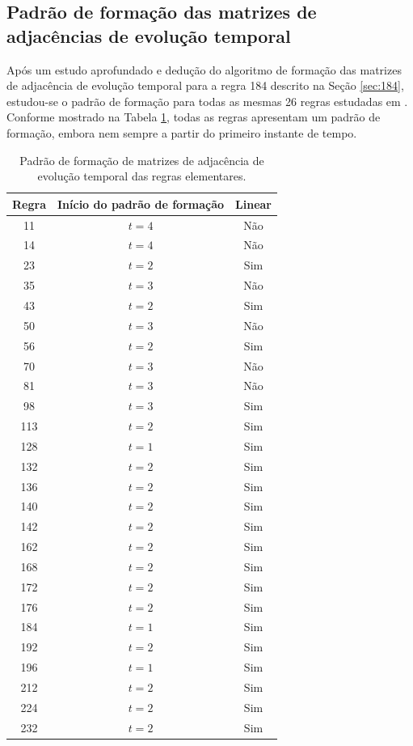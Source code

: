 \documentclass[12pt,a4paper]{article}
\begin{document}
\subsection{Padrão de formação das matrizes de adjacências de evolução temporal}\label{sec:pattern}

Após um estudo aprofundado e dedução do algoritmo de formação das matrizes
de adjacência de evolução temporal para a regra 184 descrito na Seção \ref{sec:184},
estudou-se o padrão de formação para todas as mesmas 26 regras estudadas em
. Conforme mostrado na Tabela \ref{tab:pattern},
todas as regras apresentam um padrão de formação, embora nem sempre a
partir do primeiro instante de tempo.

\begin{table}[htp]
\begin{center}
\begin{tabular}{c c c}
\hline
\textbf{Regra} & \textbf{Início do padrão de formação} & \textbf{Linear}\\ \hline
 11 & $t=4$ & Não \\
 14 & $t=4$ & Não \\
 23 & $t=2$ & Sim \\
 35 & $t=3$ & Não \\
 43 & $t=2$ & Sim \\
 50 & $t=3$ & Não \\
 56 & $t=2$ & Sim \\
 70 & $t=3$ & Não \\
 81 & $t=3$ & Não \\
 98 & $t=3$ & Sim \\
113 & $t=2$ & Sim \\
128 & $t=1$ & Sim \\
132 & $t=2$ & Sim \\
136 & $t=2$ & Sim \\
140 & $t=2$ & Sim \\
142 & $t=2$ & Sim \\
162 & $t=2$ & Sim \\
168 & $t=2$ & Sim \\
172 & $t=2$ & Sim \\
176 & $t=2$ & Sim \\
184 & $t=1$ & Sim \\
192 & $t=2$ & Sim \\
196 & $t=1$ & Sim \\
212 & $t=2$ & Sim \\
224 & $t=2$ & Sim \\
232 & $t=2$ & Sim \\
\end{tabular}
\caption{Padrão de formação de matrizes de adjacência de evolução temporal das
regras elementares.}
\label{tab:pattern}
\end{center}
\end{table}
\end{document}
